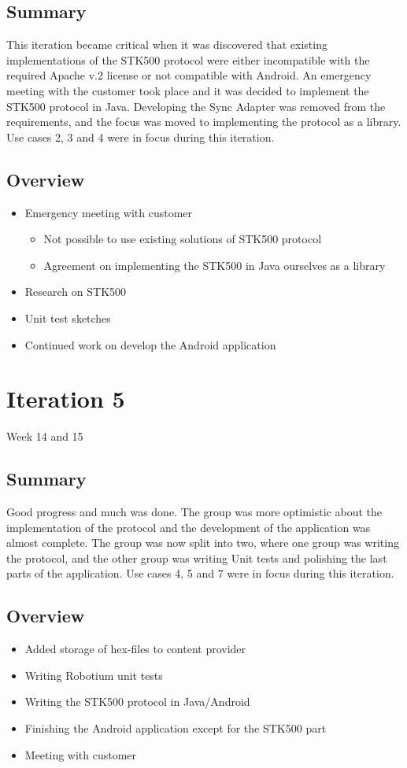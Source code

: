 \subsection{Summary}
	This iteration became critical when it was discovered that existing implementations of the STK500 protocol were either incompatible with the required Apache v.2 license or not compatible with Android. An emergency meeting with the customer took place and it was decided to implement the STK500 protocol in Java. Developing the Sync Adapter was removed from the requirements, and the focus was moved to implementing the protocol as a library. Use cases 2, 3 and 4 were in focus during this iteration.

\subsection{Overview}
\begin{itemize}
	\item{Emergency meeting with customer}
	\begin{itemize}
		\item{Not possible to use existing solutions of STK500 protocol}
		\item{Agreement on implementing the STK500 in Java ourselves as a library}
	\end{itemize}
	\item{Research on STK500}
	\item{Unit test sketches}
	\item{Continued work on develop the Android application}
\end{itemize}

\section{Iteration 5}
Week 14 and 15
\subsection{Summary}
	Good progress and much was done. The group was more optimistic about the implementation of the protocol and the development of the application was almost complete.	The group was now split into two, where one group was writing the protocol, and the other group was writing Unit tests and polishing the last parts of the application. Use cases 4, 5 and 7 were in focus during this iteration.

\subsection{Overview}
\begin{itemize}
	\item{Added storage of hex-files to content provider}
	\item{Writing Robotium unit tests}
	\item{Writing the STK500 protocol in Java/Android}
	\item{Finishing the Android application except for the STK500 part}
	\item{Meeting with customer}
\end{itemize}

